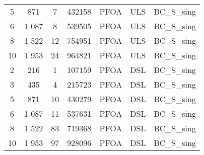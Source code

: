\begin{longtable}[c]{ccccccc}
5 & 871 & 7 & 432158 & PFOA & ULS & BC\_S\_sing \\
6 & 1 087 & 8 & 539505 & PFOA & ULS & BC\_S\_sing \\
8 & 1 522 & 12 & 754951 & PFOA & ULS & BC\_S\_sing \\
10 & 1 953 & 24 & 964821 & PFOA & ULS & BC\_S\_sing \\
2 & 216 & 1 & 107159 & PFOA & DSL & BC\_S\_sing \\
3 & 435 & 4 & 215723 & PFOA & DSL & BC\_S\_sing \\
5 & 871 & 10 & 430279 & PFOA & DSL & BC\_S\_sing \\
6 & 1 087 & 11 & 537631 & PFOA & DSL & BC\_S\_sing \\
8 & 1 522 & 83 & 719368 & PFOA & DSL & BC\_S\_sing \\
10 & 1 953 & 97 & 928096 & PFOA & DSL & BC\_S\_sing \\ \bottomrule
\end{longtable}